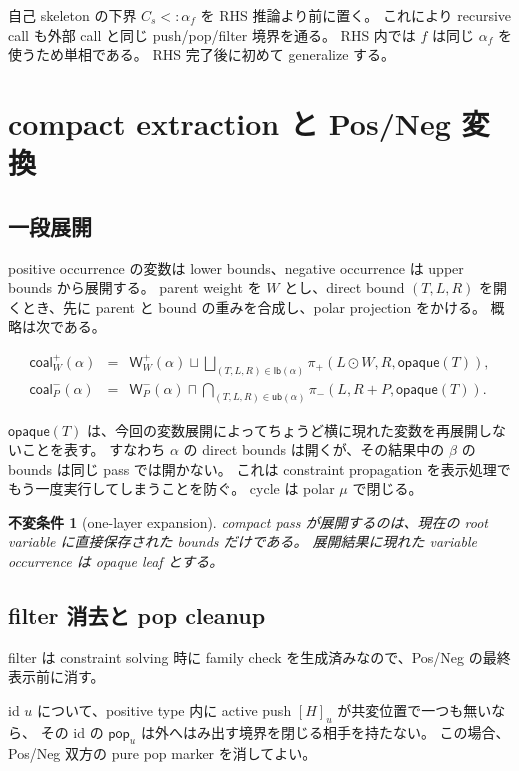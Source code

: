 \documentclass[uplatex,dvipdfmx,a4paper,10.5pt]{jsarticle}
\theoremstyle{jpplain}
\newtheorem{invariant}[definition]{不変条件}
\newcommand{\lb}{\mathsf{lb}}
\newcommand{\ub}{\mathsf{ub}}
\newcommand{\coal}{\mathsf{coal}}
\newcommand{\projp}{\pi_{+}}
\newcommand{\projn}{\pi_{-}}
\newcommand{\PWeight}[2]{\mathsf{W}^{+}_{#1}(#2)}
\newcommand{\NWeight}[2]{\mathsf{W}^{-}_{#1}(#2)}
\newcommand{\takeop}[2]{[#1]_{#2}}
\newcommand{\popop}[1]{\mathsf{pop}_{#1}}
\newcommand{\opq}{\mathsf{opaque}}
\begin{document}
自己 skeleton の下界 $C_s<:\alpha_f$ を RHS 推論より前に置く。
これにより recursive call も外部 call と同じ push/pop/filter 境界を通る。
RHS 内では $f$ は同じ $\alpha_f$ を使うため単相である。
RHS 完了後に初めて generalize する。

\section{compact extraction と Pos/Neg 変換}

\subsection{一段展開}

positive occurrence の変数は lower bounds、negative occurrence は upper bounds から展開する。
parent weight を $W$ とし、direct bound $(T,L,R)$ を開くとき、先に parent と bound の重みを合成し、polar projection をかける。
概略は次である。

\[
\begin{array}{rcl}
\coal^+_W(\alpha)
 &=& \PWeight{W}{\alpha}
 \sqcup
 \displaystyle\bigsqcup_{(T,L,R)\in\lb(\alpha)}
 \projp(L\odot W,R,\opq(T)),\\[1ex]
\coal^-_P(\alpha)
 &=& \NWeight{P}{\alpha}
 \sqcap
 \displaystyle\bigcap_{(T,L,R)\in\ub(\alpha)}
 \projn(L,R+P,\opq(T)).
\end{array}
\]

$\opq(T)$ は、今回の変数展開によってちょうど横に現れた変数を再展開しないことを表す。
すなわち $\alpha$ の direct bounds は開くが、その結果中の $\beta$ の bounds は同じ pass では開かない。
これは constraint propagation を表示処理でもう一度実行してしまうことを防ぐ。
cycle は polar $\mu$ で閉じる。

\begin{invariant}[one-layer expansion]
compact pass が展開するのは、現在の root variable に直接保存された bounds だけである。
展開結果に現れた variable occurrence は opaque leaf とする。
\end{invariant}

\subsection{filter 消去と pop cleanup}

filter は constraint solving 時に family check を生成済みなので、Pos/Neg の最終表示前に消す。

id $u$ について、positive type 内に active push $\takeop{H}{u}$ が共変位置で一つも無いなら、
その id の $\popop{u}$ は外へはみ出す境界を閉じる相手を持たない。
この場合、Pos/Neg 双方の pure pop marker を消してよい。
\end{document}
